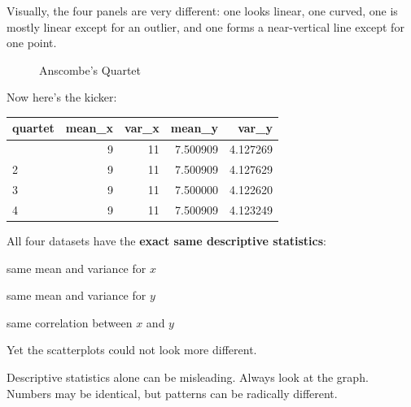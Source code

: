 \documentclass[
  letterpaper,
  DIV=11,
  numbers=noendperiod]{scrreprt}
\begin{document}
Visually, the four panels are very different: one looks linear, one
curved, one is mostly linear except for an outlier, and one forms a
near-vertical line except for one point.

\begin{figure}


\caption{\label{fig-anscombe}Anscombe's Quartet}

\end{figure}%

Now here's the kicker:

\begin{longtable}[]{@{}lrrrr@{}}
\toprule\noalign{}
quartet & mean\_x & var\_x & mean\_y & var\_y \\
\midrule\noalign{}
\endhead
\bottomrule\noalign{}
\endlastfoot
1 & 9 & 11 & 7.500909 & 4.127269 \\
2 & 9 & 11 & 7.500909 & 4.127629 \\
3 & 9 & 11 & 7.500000 & 4.122620 \\
4 & 9 & 11 & 7.500909 & 4.123249 \\
\end{longtable}

All four datasets have the \textbf{exact same descriptive statistics}:

same mean and variance for \(x\)

same mean and variance for \(y\)

same correlation between \(x\) and \(y\)

Yet the scatterplots could not look more different.

\begin{tcolorbox}[enhanced jigsaw, title=\textcolor{quarto-callout-note-color}{\faInfo}\hspace{0.5em}{Takeaway}, colframe=quarto-callout-note-color-frame, colbacktitle=quarto-callout-note-color!10!white, bottomtitle=1mm, leftrule=.75mm, rightrule=.15mm, titlerule=0mm, arc=.35mm, colback=white, opacitybacktitle=0.6, toprule=.15mm, toptitle=1mm, bottomrule=.15mm, coltitle=black, breakable, left=2mm, opacityback=0]

Descriptive statistics alone can be misleading. Always look at the
graph. Numbers may be identical, but patterns can be radically
different.

\end{tcolorbox}
\end{document}
